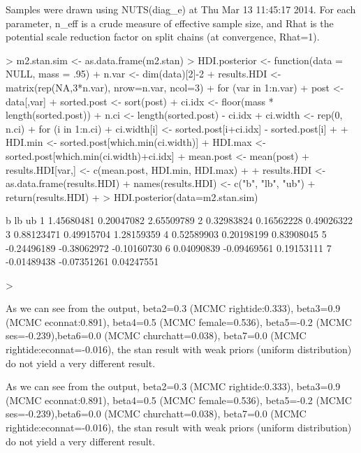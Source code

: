 \documentclass[12pt]{article}
\begin{document}
\begin{enumerate}
\begin{Schunk}
\begin{Soutput}
Samples were drawn using NUTS(diag_e) at Thu Mar 13 11:45:17 2014.
For each parameter, n_eff is a crude measure of effective sample size,
and Rhat is the potential scale reduction factor on split chains (at 
convergence, Rhat=1).
\end{Soutput}
\begin{Sinput}
> m2.stan.sim <- as.data.frame(m2.stan)
> HDI.posterior <- function(data = NULL, mass = .95) {
+     n.var <- dim(data)[2]-2
+     results.HDI <- matrix(rep(NA,3*n.var), nrow=n.var, ncol=3)
+     for (var in 1:n.var) {
+         post <- data[,var]
+         sorted.post <- sort(post)
+         ci.idx <- floor(mass * length(sorted.post))
+         n.ci <- length(sorted.post) - ci.idx
+         ci.width <- rep(0, n.ci)
+         for (i in 1:n.ci) {
+             ci.width[i] <- sorted.post[i+ci.idx] - sorted.post[i]
+         }
+         HDI.min <- sorted.post[which.min(ci.width)]
+         HDI.max <- sorted.post[which.min(ci.width)+ci.idx]
+         mean.post <- mean(post)
+         results.HDI[var,] <- c(mean.post, HDI.min, HDI.max)
+     }  
+     results.HDI <- as.data.frame(results.HDI)
+     names(results.HDI) <- c("b", "lb", "ub")
+     return(results.HDI)
+ }
> HDI.posterior(data=m2.stan.sim)
\end{Sinput}
\begin{Soutput}
            b          lb          ub
1  1.45680481  0.20047082  2.65509789
2  0.32983824  0.16562228  0.49026322
3  0.88123471  0.49915704  1.28159359
4  0.52589903  0.20198199  0.83908045
5 -0.24496189 -0.38062972 -0.10160730
6  0.04090839 -0.09469561  0.19153111
7 -0.01489438 -0.07351261  0.04247551
\end{Soutput}
\begin{Sinput}
> 
\end{Sinput}
\end{Schunk}
As we can see from the output, beta2=0.3 (MCMC rightide:0.333), beta3=0.9 (MCMC econnat:0.891), beta4=0.5 (MCMC female=0.536), beta5=-0.2 (MCMC ses=-0.239),beta6=0.0 (MCMC churchatt=0.038), beta7=0.0 (MCMC rightide:econnat=-0.016), the stan result with weak priors (uniform distribution) do not yield a very different result.


As we can see from the output, beta2=0.3 (MCMC rightide:0.333), beta3=0.9 (MCMC econnat:0.891), beta4=0.5 (MCMC female=0.536), beta5=-0.2 (MCMC ses=-0.239),beta6=0.0 (MCMC churchatt=0.038), beta7=0.0 (MCMC rightide:econnat=-0.016), the stan result with weak priors (uniform distribution) do not yield a very different result.


\end{enumerate}
\end{document}
